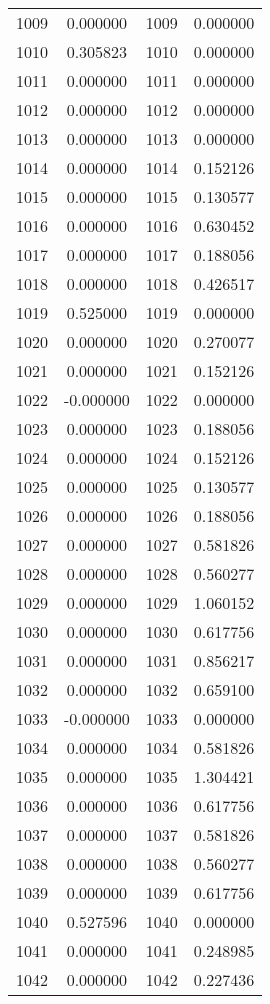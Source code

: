 \documentclass[12pt]{article}
\begin{document}
\begin{longtable}{@{}cccc@{}}
1009 & 0.000000 & 1009 & 0.000000 \\
1010 & 0.305823 & 1010 & 0.000000 \\
1011 & 0.000000 & 1011 & 0.000000 \\
1012 & 0.000000 & 1012 & 0.000000 \\
1013 & 0.000000 & 1013 & 0.000000 \\
1014 & 0.000000 & 1014 & 0.152126 \\
1015 & 0.000000 & 1015 & 0.130577 \\
1016 & 0.000000 & 1016 & 0.630452 \\
1017 & 0.000000 & 1017 & 0.188056 \\
1018 & 0.000000 & 1018 & 0.426517 \\
1019 & 0.525000 & 1019 & 0.000000 \\
1020 & 0.000000 & 1020 & 0.270077 \\
1021 & 0.000000 & 1021 & 0.152126 \\
1022 & -0.000000 & 1022 & 0.000000 \\
1023 & 0.000000 & 1023 & 0.188056 \\
1024 & 0.000000 & 1024 & 0.152126 \\
1025 & 0.000000 & 1025 & 0.130577 \\
1026 & 0.000000 & 1026 & 0.188056 \\
1027 & 0.000000 & 1027 & 0.581826 \\
1028 & 0.000000 & 1028 & 0.560277 \\
1029 & 0.000000 & 1029 & 1.060152 \\
1030 & 0.000000 & 1030 & 0.617756 \\
1031 & 0.000000 & 1031 & 0.856217 \\
1032 & 0.000000 & 1032 & 0.659100 \\
1033 & -0.000000 & 1033 & 0.000000 \\
1034 & 0.000000 & 1034 & 0.581826 \\
1035 & 0.000000 & 1035 & 1.304421 \\
1036 & 0.000000 & 1036 & 0.617756 \\
1037 & 0.000000 & 1037 & 0.581826 \\
1038 & 0.000000 & 1038 & 0.560277 \\
1039 & 0.000000 & 1039 & 0.617756 \\
1040 & 0.527596 & 1040 & 0.000000 \\
1041 & 0.000000 & 1041 & 0.248985 \\
1042 & 0.000000 & 1042 & 0.227436 \\

\end{longtable}
\end{document}
